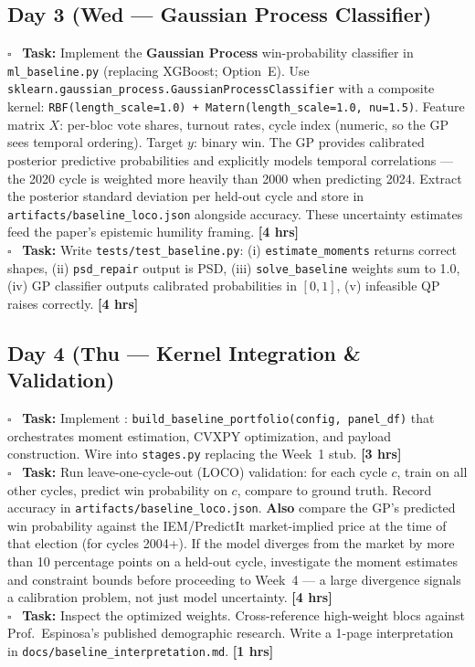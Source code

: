 \documentclass[11pt]{article}
\newcommand{\hrs}[1]{\textbf{[#1 hrs]}}
\newcommand{\dayhead}[2]{%
  \subsection*{Day #1 \normalfont\small\color{codegray}(#2)}}
\newcommand{\task}[2]{%
  \noindent\textbf{Task:} #1 \hfill \hrs{#2}\\}
\newcommand{\done}{\textcolor{sectionblue}{$\square$}\ }
\begin{document}
\dayhead{3}{Wed --- Gaussian Process Classifier}

\begin{taskbox}
\done \task{Implement the \textbf{Gaussian Process} win-probability classifier
  in \texttt{ml\_baseline.py} (replacing XGBoost; Option~E).
  Use \texttt{sklearn.gaussian\_process.GaussianProcessClassifier} with a
  composite kernel: \texttt{RBF(length\_scale=1.0) + Matern(length\_scale=1.0,
  nu=1.5)}. Feature matrix $X$: per-bloc vote shares, turnout rates, cycle
  index (numeric, so the GP sees temporal ordering). Target $y$: binary win.
  The GP provides calibrated posterior predictive probabilities and explicitly
  models temporal correlations --- the 2020 cycle is weighted more heavily than
  2000 when predicting 2024. Extract the posterior standard deviation per
  held-out cycle and store in \texttt{artifacts/baseline\_loco.json} alongside
  accuracy. These uncertainty estimates feed the paper's epistemic humility
  framing.}{4}

\done \task{Write \texttt{tests/test\_baseline.py}: (i) \texttt{estimate\_moments}
  returns correct shapes, (ii) \texttt{psd\_repair} output is PSD, (iii)
  \texttt{solve\_baseline} weights sum to 1.0, (iv) GP classifier outputs
  calibrated probabilities in $[0,1]$, (v) infeasible QP raises correctly.}{4}
\end{taskbox}

\dayhead{4}{Thu --- Kernel Integration \& Validation}

\begin{taskbox}
\done \task{Implement :
  \texttt{build\_baseline\_portfolio(config, panel\_df)} that orchestrates
  moment estimation, CVXPY optimization, and payload construction.
  Wire into \texttt{stages.py} replacing the Week~1 stub.}{3}

\done \task{Run leave-one-cycle-out (LOCO) validation: for each cycle $c$,
  train on all other cycles, predict win probability on $c$, compare to
  ground truth. Record accuracy in \texttt{artifacts/baseline\_loco.json}.
  \textbf{Also} compare the GP's predicted win probability against the
  IEM/PredictIt market-implied price at the time of that election (for
  cycles 2004+). If the model diverges from the market by more than 10
  percentage points on a held-out cycle, investigate the moment estimates
  and constraint bounds before proceeding to Week~4 --- a large divergence
  signals a calibration problem, not just model uncertainty.}{4}

\done \task{Inspect the optimized weights. Cross-reference high-weight blocs
  against Prof.\ Espinosa's published demographic research. Write a 1-page
  interpretation in \texttt{docs/baseline\_interpretation.md}.}{1}
\end{taskbox}
\end{document}
